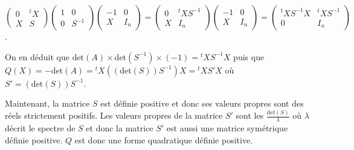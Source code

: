{{\begin{center}
$\left(
\begin{array}{cc}
0&{^t}X\\
X&S
\end{array}\right)\left(
\begin{array}{cc}
1&0\\
0&S^{-1}
\end{array}\right)\left(
\begin{array}{cc}
-1&0\\
X&I_n
\end{array}\right)=\left(
\begin{array}{cc}
0&{^t}XS^{-1}\\
X&I_n
\end{array}\right)\left(
\begin{array}{cc}
-1&0\\
X&I_n
\end{array}\right)=\left(
\begin{array}{cc}
{^t}XS^{-1}X&{^t}XS^{-1}\\
0&I_n
\end{array}\right)$.
\end{center}

On en déduit que $\text{det}(A)\times\text{det}(S^{-1})\times(-1)={^t}XS^{-1}X$ puis que $Q(X)=-\text{det}(A)={^t}X((\text{det}(S))S^{-1})X ={^t}XS'X$ où $S'=(\text{det}(S))S^{-1}$.

Maintenant, la matrice $S$ est définie positive et donc ses valeurs propres sont des réels strictement positifs. Les valeurs propres de la matrice $S'$ sont les $\frac{\text{det}(S)}{\lambda}$ où $\lambda$ décrit le spectre de $S$ et donc la matrice $S'$ est aussi une matrice symétrique définie positive. $Q$ est donc une forme quadratique définie positive.
}
}
